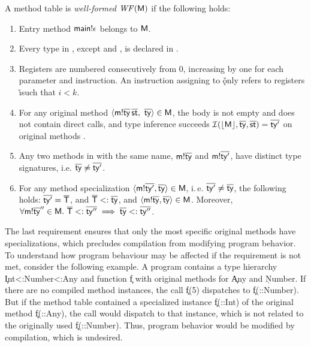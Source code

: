 \begin{definition}\label{ref:def-well-formed}
A method table is \emph{well-formed} $\mathit{WF}(\mathsf{M})$ if the following
holds:
\begin{enumerate}
\item Entry method $\mathsf{main}!{\epsilon}$ belongs to $\mathsf{M}$.
\item Every type \ty in \mtbl, except \int and \any, is declared in \tytbl.
\item Registers are numbered consecutively from 0, increasing by one for each
  parameter and instruction. An instruction assigning to \v\k only refers to
  registers \v\i such that $i<k$.
\item For any original method $\langle
  \mathsf{m}!{\overline{\mathsf{ty}}}\,\overline{\mathsf{st}},\ \overline{\mathsf{ty}} \rangle \in \mathsf{M}$, the body is
  not empty and does not contain direct calls, and type
  inference succeeds
  $\operatorname{\mathcal{I}}(\lfloor \mathsf{M} \rfloor, \overline{\mathsf{ty}}, \overline{\mathsf{st}})=\overline{\mathsf{ty}'}$
  on original methods \origmtbl\mtbl.
\item Any two methods in \mtbl with the same name,
  $\mathsf{m}!{\overline{\mathsf{ty}}}$ and $\mathsf{m}!{\overline{\mathsf{ty}'}}$, have distinct type
  signatures, i.e. $\overline{\mathsf{ty}} \neq \overline{\mathsf{ty}'}$.
  \item For any method specialization $\langle \mathsf{m}!{\overline{\mathsf{ty}'}}, \overline{\mathsf{ty}}\rangle\in\mathsf{M}$,
  i.\,e. $\overline{\mathsf{ty}'} \neq \overline{\mathsf{ty}}$, the following holds:
  $\overline{\mathsf{ty}'} = \overline{\mathsf{T}}$, and
  $\overline{\mathsf{T}} <: \overline{\mathsf{ty}}$, and
  $\langle \mathsf{m}!{\overline{\mathsf{ty}}}, \overline{\mathsf{ty}}\rangle\in\mathsf{M}$.
  Moreover,
   $\forall \mathsf{m}!{\overline{\mathsf{ty}}''} \in \mathsf{M}.\
      \overline{\mathsf{T}} <: \overline{\mathsf{ty}''} \implies \overline{\mathsf{ty}} <: \overline{\mathsf{ty}''}$.
\end{enumerate}
\end{definition}

The last requirement ensures that only the most specific original methods have
specializations, which precludes compilation from modifying program behavior.
%
To understand how program behaviour may be affected if the requirement is not
met, consider the following example.
A program contains a type hierarchy
\c{Int<:Number<:Any} and function \c{f} with original methods for \c{Any} and
\c{Number}. If there are no compiled method instances, the call \c{f(5)}
dispatches to \c{f(::Number)}. But if the method table contained a specialized
instance \c{f(::Int)} of the original method \c{f(::Any)}, the call would dispatch
to that instance, which is not related to the originally used \c{f(::Number)}.
Thus, program behavior would be modified by compilation, which is undesired.

